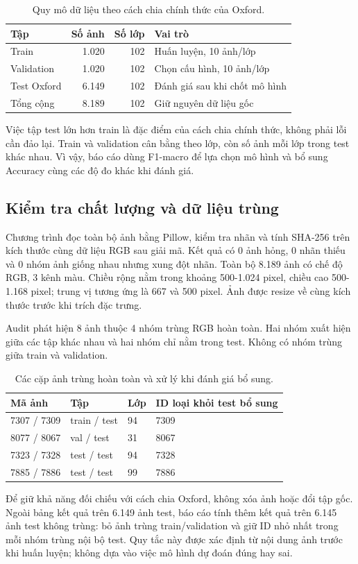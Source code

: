 \begin{table}[H]\centering
\caption{Quy mô dữ liệu theo cách chia chính thức của Oxford.}\label{tab:split}
\begin{tabular}{lrrl}\toprule
Tập & Số ảnh & Số lớp & Vai trò\\\midrule
Train & 1.020 & 102 & Huấn luyện, 10 ảnh/lớp\\
Validation & 1.020 & 102 & Chọn cấu hình, 10 ảnh/lớp\\
Test Oxford & 6.149 & 102 & Đánh giá sau khi chốt mô hình\\\midrule
Tổng cộng & 8.189 & 102 & Giữ nguyên dữ liệu gốc\\\bottomrule
\end{tabular}
\end{table}
Việc tập test lớn hơn train là đặc điểm của cách chia chính thức, không phải lỗi cần đảo lại. Train và validation cân bằng theo lớp, còn số ảnh mỗi lớp trong test khác nhau. Vì vậy, báo cáo dùng F1-macro để lựa chọn mô hình và bổ sung Accuracy cùng các độ đo khác khi đánh giá.


\subsection{Kiểm tra chất lượng và dữ liệu trùng}
Chương trình đọc toàn bộ ảnh bằng Pillow, kiểm tra nhãn và tính SHA-256 trên kích thước cùng dữ liệu RGB sau giải mã. Kết quả có 0 ảnh hỏng, 0 nhãn thiếu và 0 nhóm ảnh giống nhau nhưng xung đột nhãn. Toàn bộ 8.189 ảnh có chế độ RGB, 3 kênh màu. Chiều rộng nằm trong khoảng 500-1.024 pixel, chiều cao 500-1.168 pixel; trung vị tương ứng là 667 và 500 pixel. Ảnh được resize về cùng kích thước trước khi trích đặc trưng.

Audit phát hiện 8 ảnh thuộc 4 nhóm trùng RGB hoàn toàn. Hai nhóm xuất hiện giữa các tập khác nhau và hai nhóm chỉ nằm trong test. Không có nhóm trùng giữa train và validation.
\begin{table}[H]\centering
\caption{Các cặp ảnh trùng hoàn toàn và xử lý khi đánh giá bổ sung.}\label{tab:duplicates}
\begin{tabular}{llll}\toprule
Mã ảnh & Tập & Lớp & ID loại khỏi test bổ sung\\\midrule
7307 / 7309 & train / test & 94 & 7309\\
8077 / 8067 & val / test & 31 & 8067\\
7323 / 7328 & test / test & 94 & 7328\\
7885 / 7886 & test / test & 99 & 7886\\\bottomrule
\end{tabular}
\end{table}
Để giữ khả năng đối chiếu với cách chia Oxford, không xóa ảnh hoặc đổi tập gốc. Ngoài bảng kết quả trên 6.149 ảnh test, báo cáo tính thêm kết quả trên 6.145 ảnh test không trùng: bỏ ảnh trùng train/validation và giữ ID nhỏ nhất trong mỗi nhóm trùng nội bộ test. Quy tắc này được xác định từ nội dung ảnh trước khi huấn luyện; không dựa vào việc mô hình dự đoán đúng hay sai.

